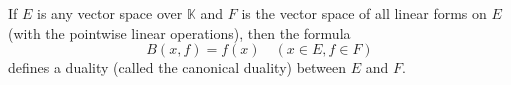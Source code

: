 If $E$ is any vector space over $\mathbb{K}$ and $F$ is the vector space of all linear forms on $E$ (with the pointwise linear operations), then the formula
$$B(x, f) = f(x) \quad (x \in E, f \in F)$$
defines a duality (called the canonical duality) between $E$ and $F$.
